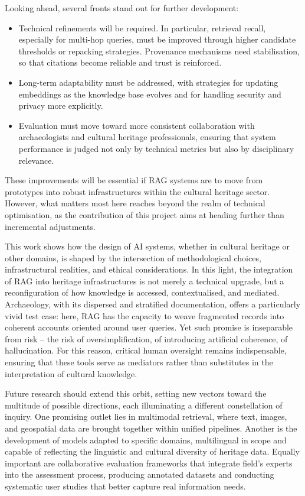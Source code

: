 \begin{spacing}{1.5}
Looking ahead, several fronts stand out for further development:
\begin{itemize}
    \item Technical refinements will be required. In particular, retrieval recall, especially for multi-hop queries, must be improved through higher candidate thresholds or repacking strategies. Provenance mechanisms need stabilisation, so that citations become reliable and trust is reinforced. 
    \item Long-term adaptability must be addressed, with strategies for updating embeddings as the knowledge base evolves and for handling security and privacy more explicitly.
    \item Evaluation must move toward more consistent collaboration with archaeologists and cultural heritage professionals, ensuring that system performance is judged not only by technical metrics but also by disciplinary relevance.
\end{itemize}

These improvements will be essential if RAG systems are to move from prototypes into robust infrastructures within the cultural heritage sector. However, what matters most here reaches beyond the realm of technical optimisation, as the contribution of this project aims at heading further than incremental adjustments. 

This work shows how the design of AI systems, whether in cultural heritage or other domains, is shaped by the intersection of methodological choices, infrastructural realities, and ethical considerations. In this light, the integration of RAG into heritage infrastructures is not merely a technical upgrade, but a reconfiguration of how knowledge is accessed, contextualised, and mediated. Archaeology, with its dispersed and stratified documentation, offers a particularly vivid test case: here, RAG has the capacity to weave fragmented records into coherent accounts oriented around user queries. Yet such promise is inseparable from risk -- the risk of oversimplification, of introducing artificial coherence, of hallucination. For this reason, critical human oversight remains indispensable, ensuring that these tools serve as mediators rather than substitutes in the interpretation of cultural knowledge.

Future research should extend this orbit, setting new vectors toward the multitude of possible directions, each illuminating a different constellation of inquiry. One promising outlet lies in multimodal retrieval, where text, images, and geospatial data are brought together within unified pipelines. Another is the development of models adapted to specific domains, multilingual in scope and capable of reflecting the linguistic and cultural diversity of heritage data. Equally important are collaborative evaluation frameworks that integrate field's experts into the assessment process, producing annotated datasets and conducting systematic user studies that better capture real information needs.


\end{spacing}
